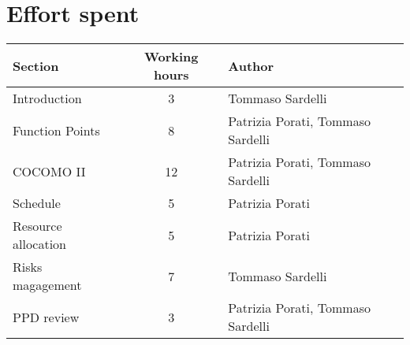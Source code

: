 \pagebreak

\section{Effort spent}

\begin{center}
	\begin{tabular}{ l c l } 
		\hline
		\textbf{Section} 	& \textbf{Working hours} 	& \textbf{Author} \\ 
		\hline
		Introduction 	& 3 	& Tommaso Sardelli	\\
		Function Points	 	& 8 	& Patrizia Porati, Tommaso Sardelli	\\
		COCOMO II 	& 12 	& Patrizia Porati, Tommaso Sardelli \\ 
		Schedule 	& 5 	& Patrizia Porati	\\
		Resource allocation 	& 5 	& Patrizia Porati \\
		Risks magagement 	& 7 	& Tommaso Sardelli \\
		PPD review 	& 3 	& Patrizia Porati, Tommaso Sardelli \\
		\hline
	\end{tabular}
	\vspace{0.4cm}
\end{center}
